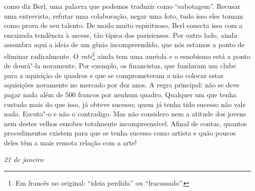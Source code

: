 como diz Berl, uma palavra que podemos traduzir como ``sabotagem''. Recusar uma entrevista,
refutar uma colaboração, negar uma foto, tudo isso eles tomam como prova
de seu talento. De modo muito espirituoso, Berl conecta isso com a
enraizada tendência à ascese, tão típica dos parisienses. Por outro lado,
ainda assombra aqui a ideia de um gênio incompreendido, que nós estamos a ponto de eliminar
radicalmente. O \emph{raté}\footnote{Em francês no original:
  ``ideia perdida'' ou ``fracassado''. \versal{[N.~T.]}} ainda tem
uma auréola e o esnobismo está a ponto de dourá"-la novamente. Por
exemplo, os financistas, que fundaram um clube para a aquisição de
quadros e que se comprometeram a não colocar estas aquisições novamente
no mercado por dez anos. A regra principal: não se deve pagar nada além
de 500 francos por nenhum quadro. Qualquer um que tenha custado mais do
que isso, já obteve sucesso; quem já tenha tido sucesso não vale nada.
Escuto"-o e não o contradigo. Mas não considero nem a atitude dos jovens
nem destes velhos esnobes totalmente incompreensível. Afinal de contas,
quantos procedimentos existem para que se tenha sucesso como artista e
quão poucos deles têm a mais remota relação com a arte!


\begin{flushright}
\emph{21 de janeiro}
\end{flushright}

